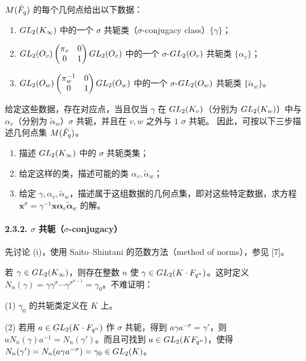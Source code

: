 $M(\bar{F}_q)$ 的每个几何点给出以下数据：
\begin{enumerate}[label=(\roman*)]
\item $GL_2(K_\infty)$ 中的一个 $\sigma$ 共轭类（$\sigma$-conjugacy class）$\{\gamma\}$；
\item $GL_2(O_v)\begin{pmatrix}\pi_v&0\\0&1\end{pmatrix}GL_2(O_v)$ 中的一个
$\sigma$-$GL_2(O_v)$ 共轭类 $\{\alpha_v\}$；
\item $GL_2(O_w)\begin{pmatrix}\pi_w^{-1}&0\\0&1\end{pmatrix}GL_2(O_w)$ 中的一个
$\sigma$-$GL_2(O_w)$ 共轭类 $\{\widetilde\alpha_w\}$。
\end{enumerate}
给定这些数据，存在对应点，当且仅当 $\gamma$ 在 $GL_2(K_v)$（分别为 $GL_2(K_w)$）中与 $\alpha_v$（分别为 $\widetilde\alpha_w$）$\sigma$ 共轭，并且在 $v,w$ 之外与 $1$ $\sigma$ 共轭。
因此，可按以下三步描述几何点集 $M(\bar{F}_q)$。
\begin{enumerate}[label=(\roman*)]
\item 描述 $GL_2(K_\infty)$ 中的 $\sigma$ 共轭类集；
\item 给定这样的类，描述可能的类 $\alpha_v,\widetilde\alpha_w$；
\item 给定 $\gamma,\alpha_v,\widetilde\alpha_w$，描述属于这组数据的几何点集，即对这些特定数据，求方程
$\boldsymbol x^\sigma=\gamma^{-1}\boldsymbol x\boldsymbol\alpha_v\widetilde{\boldsymbol\alpha}_w$ 的解。
\end{enumerate}
\paragraph*{2.3.2. $\sigma$ 共轭（$\sigma$-conjugacy）}
先讨论 (i)，使用 Saito--Shintani 的范数方法（method of norms），参见 [7]。

若 $\gamma\in GL_2(K_\infty)$，则存在整数 $n$ 使 $\gamma\in GL_2(K\cdot F_{q^n})$。这时定义
$N_n(\gamma)=\gamma\gamma^\sigma\cdots\gamma^{\sigma^{n-1}}=\gamma_0$。不难证明：

(1) $\gamma_0$ 的共轭类定义在 $K$ 上。

(2) 若用 $a\in GL_2(K\cdot F_{q^n})$ 作 $\sigma$ 共轭，得到
$a\gamma a^{-\sigma}=\gamma'$，则
$aN_n(\gamma)a^{-1}=N_n(\gamma')$。而且可找到 $a\in GL_2(KF_{q^n})$，使得
$N_n(\gamma')=N_n(a\gamma a^{-\sigma})=\gamma_0\in GL_2(K)$。

